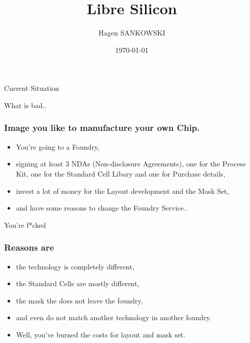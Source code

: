 \documentclass{beamer}
\title[Libre Silicon]{Libre Silicon} %
\author{Hagen SANKOWSKI} %
\institute[Chipforge] %
{
Chipforge\\ %
\medskip
\textit{hsank@nospam.chipforge.org} %
}
\date{\today} %
\begin{document}
\begin{frame}
\titlepage %
\end{frame}


\begin{frame}
Current Situation
\end{frame}

\begin{frame}
What is bad..
\end{frame}

\begin{frame}
\frametitle{Image you like to manufacture your own Chip.}
\begin{itemize}
\item You're going to a Foundry,
\item signing at least 3 NDAs (Non-disclosure Agreements), one for the Process Kit, one for the Standard Cell Libary and one for Purchase details,
\item invest a lot of money for the Layout development and the Mask Set,
\item and have some reasons to change the Foundry Service..
\end{itemize}
\end{frame}


\begin{frame}
You're f*cked
\end{frame}

\begin{frame}
\frametitle{Reasons are}
\begin{itemize}
\item the technology is completely different,
\item the Standard Cells are mostly different,
\item the mask the does not leave the foundry,
\item and even do not match another technology in another foundry.
\item Well, you've burned the costs for layout and mask set.
\end{itemize}
\end{frame}
\end{document}
